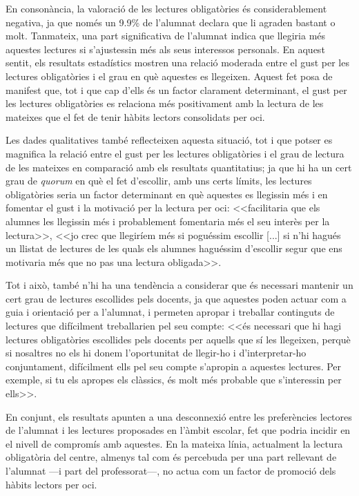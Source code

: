 \documentclass[12pt]{article}
\begin{document}
En consonància, la valoració de les lectures obligatòries és considerablement negativa, ja que només un 9.9\% de l’alumnat declara que li agraden bastant o molt. Tanmateix, una part significativa de l’alumnat indica que llegiria més aquestes lectures si s’ajustessin més als seus interessos personals. En aquest sentit, els resultats estadístics mostren una relació moderada entre el gust per les lectures obligatòries i el grau en què aquestes es llegeixen. Aquest fet posa de manifest que, tot i que cap d'ells és un factor clarament determinant, el gust per les lectures obligatòries es relaciona més positivament amb la lectura de les mateixes que el fet de tenir hàbits lectors consolidats per oci.

Les dades qualitatives també reflecteixen aquesta situació, tot i que potser es magnifica la relació entre el gust per les lectures obligatòries i el grau de lectura de les mateixes en comparació amb els resultats quantitatius; ja que hi ha un cert grau de \emph{quorum} en què el fet d'escollir, amb uns certs límits, les lectures obligatòries seria un factor determinant en què aquestes es llegissin més i en fomentar el gust i la motivació per la lectura per oci: <<facilitaria que els alumnes les llegissin més i probablement fomentaria més el seu interès per la lectura>>, <<jo crec que llegiríem més si poguéssim escollir [...] si n'hi hagués un llistat de lectures de les quals els alumnes haguéssim d'escollir segur que ens motivaria més que no pas una lectura obligada>>.

Tot i això, també n'hi ha una tendència a considerar que és necessari mantenir un cert grau de lectures escollides pels docents, ja que aquestes poden actuar com a guia i orientació per a l’alumnat, i permeten apropar i treballar continguts de lectures que difícilment treballarien pel seu compte: <<és necessari que hi hagi lectures obligatòries escollides pels docents per aquells que sí les llegeixen, perquè si nosaltres no els hi donem l'oportunitat de llegir-ho i d'interpretar-ho conjuntament, difícilment ells pel seu compte s'apropin a aquestes lectures. Per exemple, si tu els apropes els clàssics, és molt més probable que s'interessin per ells>>.

En conjunt, els resultats apunten a una desconnexió entre les preferències lectores de l’alumnat i les lectures proposades en l’àmbit escolar, fet que podria incidir en el nivell de compromís amb aquestes. En la mateixa línia, actualment la lectura obligatòria del centre, almenys tal com és percebuda per una part rellevant de l’alumnat ---i part del professorat---, no actua com un factor de promoció dels hàbits lectors per oci.
\end{document}
